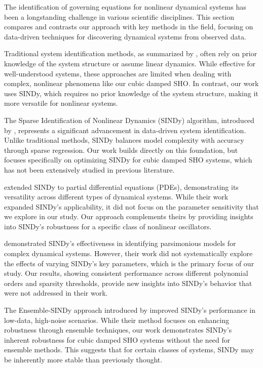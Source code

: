 \documentclass{article} %
\begin{document}
The identification of governing equations for nonlinear dynamical systems has been a longstanding challenge in various scientific disciplines. This section compares and contrasts our approach with key methods in the field, focusing on data-driven techniques for discovering dynamical systems from observed data.

Traditional system identification methods, as summarized by \citet{ljung1999system}, often rely on prior knowledge of the system structure or assume linear dynamics. While effective for well-understood systems, these approaches are limited when dealing with complex, nonlinear phenomena like our cubic damped SHO. In contrast, our work uses SINDy, which requires no prior knowledge of the system structure, making it more versatile for nonlinear systems.

The Sparse Identification of Nonlinear Dynamics (SINDy) algorithm, introduced by \citet{Brunton2016SparseIO}, represents a significant advancement in data-driven system identification. Unlike traditional methods, SINDy balances model complexity with accuracy through sparse regression. Our work builds directly on this foundation, but focuses specifically on optimizing SINDy for cubic damped SHO systems, which has not been extensively studied in previous literature.

\citet{Rudy2018DataDrivenIO} extended SINDy to partial differential equations (PDEs), demonstrating its versatility across different types of dynamical systems. While their work expanded SINDy's applicability, it did not focus on the parameter sensitivity that we explore in our study. Our approach complements theirs by providing insights into SINDy's robustness for a specific class of nonlinear oscillators.

\citet{Fuentes2019EfficientPI} demonstrated SINDy's effectiveness in identifying parsimonious models for complex dynamical systems. However, their work did not systematically explore the effects of varying SINDy's key parameters, which is the primary focus of our study. Our results, showing consistent performance across different polynomial orders and sparsity thresholds, provide new insights into SINDy's behavior that were not addressed in their work.

The Ensemble-SINDy approach introduced by \citet{Fasel2021EnsembleSINDyRS} improved SINDy's performance in low-data, high-noise scenarios. While their method focuses on enhancing robustness through ensemble techniques, our work demonstrates SINDy's inherent robustness for cubic damped SHO systems without the need for ensemble methods. This suggests that for certain classes of systems, SINDy may be inherently more stable than previously thought.
\end{document}
